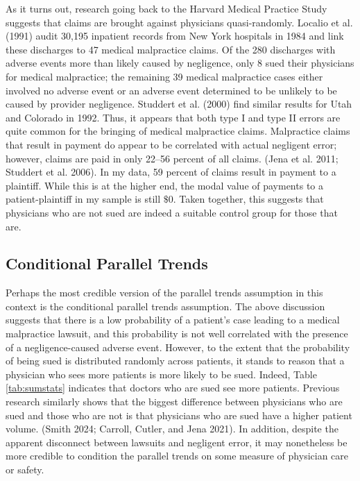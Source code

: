 \documentclass[
  12pt,
]{article}
\begin{document}
As it turns out, research going back to the Harvard Medical Practice Study suggests that claims are brought against physicians quasi-randomly. Localio et al. (1991) audit 30,195 inpatient records from New York hospitals in 1984 and link these discharges to 47 medical malpractice claims. Of the 280 discharges with adverse events more than likely caused by negligence, only 8 sued their physicians for medical malpractice; the remaining 39 medical malpractice cases either involved no adverse event or an adverse event determined to be unlikely to be caused by provider negligence. Studdert et al. (2000) find similar results for Utah and Colorado in 1992. Thus, it appears that both type I and type II errors are quite common for the bringing of medical malpractice claims. Malpractice claims that result in payment do appear to be correlated with actual negligent error; however, claims are paid in only 22--56 percent of all claims. (Jena et al. 2011; Studdert et al. 2006). In my data, 59 percent of claims result in payment to a plaintiff. While this is at the higher end, the modal value of payments to a patient-plaintiff in my sample is still \(\$0\). Taken together, this suggests that physicians who are not sued are indeed a suitable control group for those that are.

\hypertarget{conditional-parallel-trends}{%
\subsection{Conditional Parallel Trends}\label{conditional-parallel-trends}}

Perhaps the most credible version of the parallel trends assumption in this context is the conditional parallel trends assumption. The above discussion suggests that there is a low probability of a patient's case leading to a medical malpractice lawsuit, and this probability is not well correlated with the presence of a negligence-caused adverse event. However, to the extent that the probability of being sued is distributed randomly across patients, it stands to reason that a physician who sees more patients is more likely to be sued. Indeed, Table \ref{tab:sumstats} indicates that doctors who are sued see more patients. Previous research similarly shows that the biggest difference between physicians who are sued and those who are not is that physicians who are sued have a higher patient volume. (Smith 2024; Carroll, Cutler, and Jena 2021). In addition, despite the apparent disconnect between lawsuits and negligent error, it may nonetheless be more credible to condition the parallel trends on some measure of physician care or safety.
\end{document}
